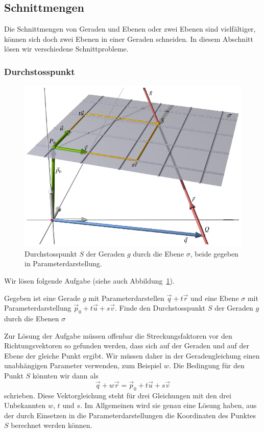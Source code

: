 \subsection{Schnittmengen}
Die Schnittmengen von Geraden und Ebenen oder zwei Ebenen sind 
vielfältiger, können sich doch zwei Ebenen in einer Geraden
schneiden.
In diesem Abschnitt lösen wir verschiedene Schnittprobleme.

\subsubsection{Durchstosspunkt}
\begin{figure}
\centering
\includegraphics{3/images/durchstosspunkt.pdf}
\caption{Durchstosspunkt $S$ der Geraden $g$ durch die Ebene $\sigma$,
beide gegeben in Parameterdarstellung.
\label{skript:affin:durchstosspunkt}}
\end{figure}
Wir lösen folgende Aufgabe (siehe auch
Abbildung~\ref{skript:affin:durchstosspunkt}).

\begin{aufgabe}
Gegeben ist eine Gerade $g$ mit Parameterdarstellen
$\vec{q}+t\vec{r}$
und eine Ebene $\sigma$ mit Parameterdarstellung
$\vec{p}_0+t\vec{u}+s\vec{v}$.
Finde den Durchstosspunkt $S$ der Geraden $g$ durch die Ebenen $\sigma$
\end{aufgabe}

Zur Lösung der Aufgabe müssen offenbar die Streckungsfaktoren vor den
Richtungsvektoren so gefunden werden, dass sich auf der Geraden und
auf der Ebene der gleiche Punkt ergibt.
Wir müssen daher in der Geradengleichung einen unabhängigen Parameter
verwenden, zum Beispiel $w$.
Die Bedingung für den Punkt $S$ könnten wir dann als
\[
\vec{q} + w\vec{r} = \vec{p}_0 + t\vec{u} + s\vec{v}
\]
schrieben.
Diese Vektorgleichung steht für drei Gleichungen mit den drei Unbekannten
$w$, $t$ und $s$.
Im Allgemeinen wird sie genau eine Lösung haben,
aus der durch Einsetzen in die Parameterdarstellungen die Koordinaten
des Punktes $S$ berechnet werden können.

